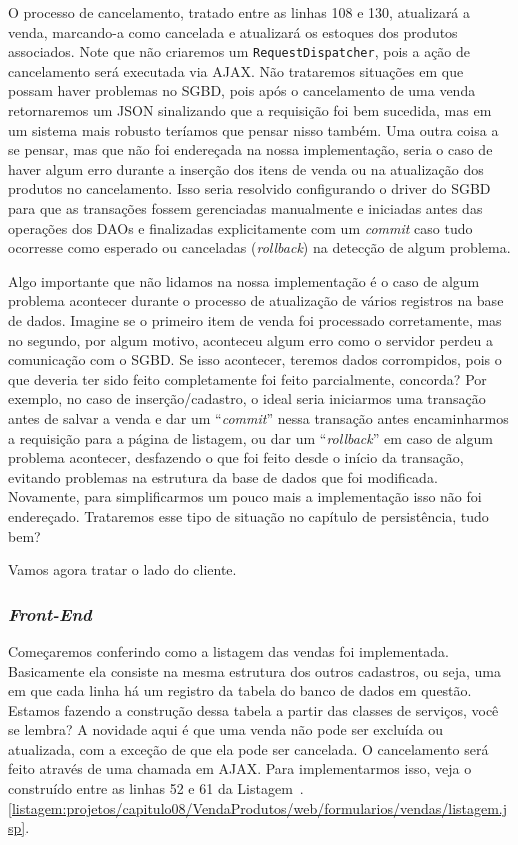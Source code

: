 O processo de cancelamento, tratado entre as linhas 108 e 130, atualizará a venda, marcando-a como cancelada e atualizará os estoques dos produtos associados. Note que não criaremos um \texttt{RequestDispatcher}, pois a ação de cancelamento será executada via AJAX. Não trataremos situações em que possam haver problemas no SGBD, pois após o cancelamento de uma venda retornaremos um JSON sinalizando que a requisição foi bem sucedida, mas em um sistema mais robusto teríamos que pensar nisso também. Uma outra coisa a se pensar, mas que não foi endereçada na nossa implementação, seria o caso de haver algum erro durante a inserção dos itens de venda ou na atualização dos produtos no cancelamento. Isso seria resolvido configurando o driver do SGBD para que as transações fossem gerenciadas manualmente e iniciadas antes das operações dos DAOs e finalizadas explicitamente com um \textit{commit} caso tudo ocorresse como esperado ou canceladas (\textit{rollback}) na detecção de algum problema.

Algo importante que não lidamos na nossa implementação é o caso de algum problema acontecer durante o processo de atualização de vários registros na base de dados. Imagine se o primeiro item de venda foi processado corretamente, mas no segundo, por algum motivo, aconteceu algum erro como o servidor perdeu a comunicação com o SGBD. Se isso acontecer, teremos dados corrompidos, pois o que deveria ter sido feito completamente foi feito parcialmente, concorda? Por exemplo, no caso de inserção/cadastro, o ideal seria iniciarmos uma transação antes de salvar a venda e dar um ``\textit{commit}'' nessa transação antes encaminharmos a requisição para a página de listagem, ou dar um ``\textit{rollback}'' em caso de algum problema acontecer, desfazendo o que foi feito desde o início da transação, evitando problemas na estrutura da base de dados que foi modificada. Novamente, para simplificarmos um pouco mais a implementação isso não foi endereçado. Trataremos esse tipo de situação no capítulo de persistência, tudo bem?

Vamos agora tratar o lado do cliente.


\subsubsection{\textit{Front-End}}

Começaremos conferindo como a listagem das vendas foi implementada. Basicamente ela consiste na mesma estrutura dos outros cadastros, ou seja, uma  em que cada linha há um registro da tabela do banco de dados em questão. Estamos fazendo a construção dessa tabela a partir das classes de serviços, você se lembra? A novidade aqui é que uma venda não pode ser excluída ou atualizada, com a exceção de que ela pode ser cancelada. O cancelamento será feito através de uma chamada em AJAX. Para implementarmos isso, veja o  construído entre as linhas 52 e 61 da Listagem~\thechapter.\ref{listagem:projetos/capitulo08/VendaProdutos/web/formularios/vendas/listagem.jsp}.

